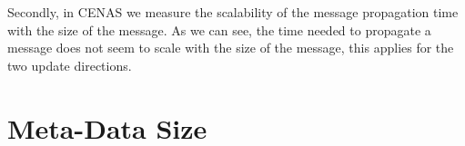 Secondly, in CENAS we  measure the scalability of the message propagation time with the size of the message. As we can see, the time needed to propagate a message does not seem to scale with the size of the message, this applies for the two update directions.

\section{Meta-Data Size}
\label{sec:meta-data_size}